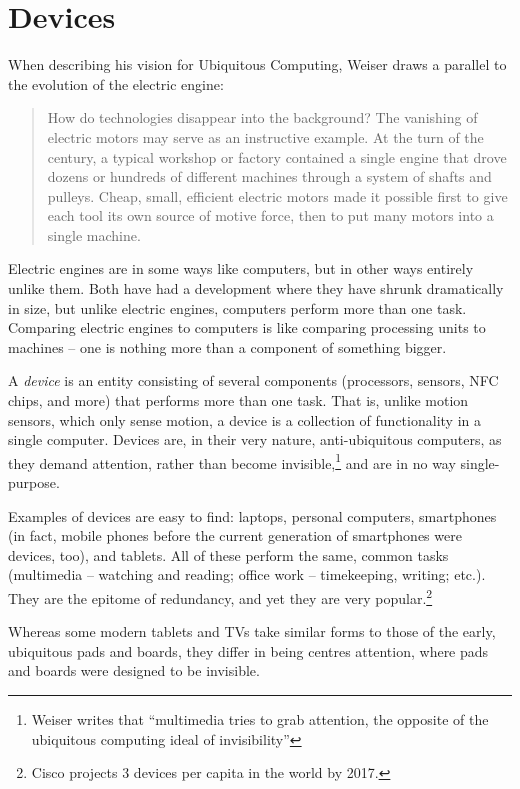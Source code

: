 \section{Devices}
\label{sec:devices}

When describing his vision for Ubiquitous Computing, Weiser draws a parallel to the evolution of the electric engine:

\begin{quote}
    How do technologies disappear into the background? The vanishing of electric motors may serve as an instructive example.
    At the turn of the century, a typical workshop or factory contained a single engine that drove dozens or hundreds of
    different machines through a system of shafts and pulleys. Cheap, small, efficient electric motors made it possible first
    to give each tool its own source of motive force, then to put many motors into a single machine.\cite{weiser91}
\end{quote}

Electric engines are in some ways like computers, but in other ways entirely unlike them. Both have had a development where
they have shrunk dramatically in size, but unlike electric engines, computers perform more than one task. Comparing electric
engines to computers is like comparing processing units to machines -- one is nothing more than a component of something bigger.

A \emph{device} is an entity consisting of several components (processors, sensors, NFC chips, and more) that performs more
than one task. That is, unlike motion sensors, which only sense motion, a device is a collection of functionality in a single
computer. Devices are, in their very nature, anti-ubiquitous computers, as they demand attention, rather than become
invisible,\footnote{Weiser writes that ``multimedia tries to grab attention, the opposite of the ubiquitous computing ideal of
invisibility''\cite{weiser93}} and are in no way single-purpose.

Examples of devices are easy to find: laptops, personal computers, smartphones (in fact, mobile phones before the current generation
of smartphones were devices, too), and tablets. All of these perform the same, common
tasks (multimedia -- watching and reading; office work -- timekeeping, writing; etc.). They are the epitome of redundancy, and yet
they are very popular.\footnote{Cisco projects 3 devices per capita in the world by 2017.\cite{cisco}}

Whereas some modern tablets and TVs take similar forms to those of the early, ubiquitous pads and boards, they differ in being
centres attention, where pads and boards were designed to be invisible.

